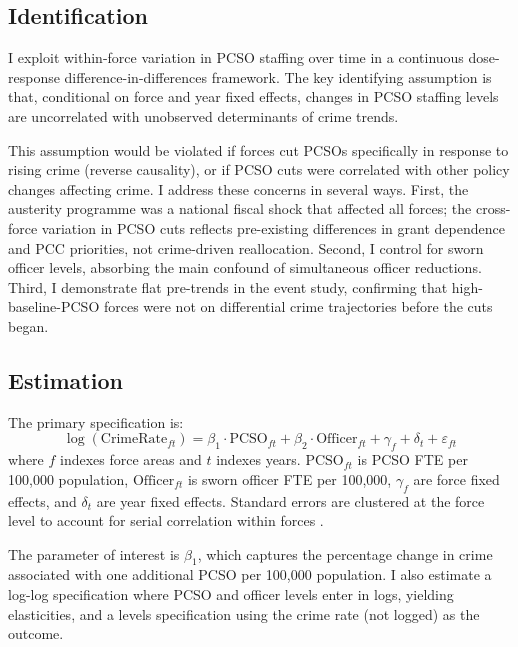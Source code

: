 \documentclass[12pt]{article}
\begin{document}
\subsection{Identification}

I exploit within-force variation in PCSO staffing over time in a continuous dose-response difference-in-differences framework. The key identifying assumption is that, conditional on force and year fixed effects, changes in PCSO staffing levels are uncorrelated with unobserved determinants of crime trends.

This assumption would be violated if forces cut PCSOs specifically in response to rising crime (reverse causality), or if PCSO cuts were correlated with other policy changes affecting crime. I address these concerns in several ways. First, the austerity programme was a national fiscal shock that affected all forces; the cross-force variation in PCSO cuts reflects pre-existing differences in grant dependence and PCC priorities, not crime-driven reallocation. Second, I control for sworn officer levels, absorbing the main confound of simultaneous officer reductions. Third, I demonstrate flat pre-trends in the event study, confirming that high-baseline-PCSO forces were not on differential crime trajectories before the cuts began.

\subsection{Estimation}

The primary specification is:
\begin{equation}
\log(\text{CrimeRate}_{ft}) = \beta_1 \cdot \text{PCSO}_{ft} + \beta_2 \cdot \text{Officer}_{ft} + \gamma_f + \delta_t + \varepsilon_{ft}
\label{eq:main}
\end{equation}
where $f$ indexes force areas and $t$ indexes years. $\text{PCSO}_{ft}$ is PCSO FTE per 100,000 population, $\text{Officer}_{ft}$ is sworn officer FTE per 100,000, $\gamma_f$ are force fixed effects, and $\delta_t$ are year fixed effects. Standard errors are clustered at the force level to account for serial correlation within forces \citep{cameron2008bootstrap}.

The parameter of interest is $\beta_1$, which captures the percentage change in crime associated with one additional PCSO per 100,000 population. I also estimate a log-log specification where PCSO and officer levels enter in logs, yielding elasticities, and a levels specification using the crime rate (not logged) as the outcome.
\end{document}
